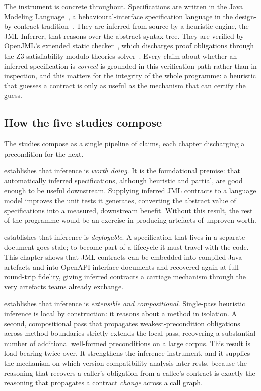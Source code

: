 The instrument is concrete throughout. Specifications are written in the Java
Modeling Language~\citep{leavens2006jml}, a behavioural-interface
specification language in the design-by-contract tradition~\citep{meyer1992dbc}.
They are inferred from source by a heuristic engine, the JML-Inferrer, that
reasons over the abstract syntax tree. They are verified by OpenJML's extended
static checker~\citep{cok2014openjml}, which discharges proof obligations through
the Z3 satisfiability-modulo-theories solver~\citep{demoura2008z3}. Every claim
about whether an inferred specification is \emph{correct} is grounded in this
verification path rather than in inspection, and this matters for the integrity
of the whole programme: a heuristic that guesses a contract is only as useful as
the mechanism that can certify the guess.

\subsection{How the five studies compose}

The studies compose as a single pipeline of claims, each chapter discharging a
precondition for the next.

 establishes that inference is \emph{worth doing}. It is the
foundational premise: that automatically inferred specifications, although
heuristic and partial, are good enough to be useful downstream. Supplying
inferred JML contracts to a language model improves the unit tests it generates,
converting the abstract value of specifications into a measured, downstream
benefit. Without this result, the rest of the programme would be an exercise in
producing artefacts of unproven worth.

 establishes that inference is \emph{deployable}. A
specification that lives in a separate document goes stale; to become part of a
lifecycle it must travel with the code. This chapter shows that JML contracts can
be embedded into compiled Java artefacts and into OpenAPI interface documents and
recovered again at full round-trip fidelity, giving inferred contracts a carriage
mechanism through the very artefacts teams already exchange.

 establishes that inference is \emph{extensible and
compositional}. Single-pass heuristic inference is local by construction: it
reasons about a method in isolation. A second, compositional pass that propagates
weakest-precondition obligations across method boundaries strictly extends the
local pass, recovering a substantial number of additional well-formed
preconditions on a large corpus. This result is load-bearing twice over. It
strengthens the inference instrument, and it supplies the mechanism on which
version-compatibility analysis later rests, because the reasoning that recovers a
caller's obligation from a callee's contract is exactly the reasoning that
propagates a contract \emph{change} across a call graph.

